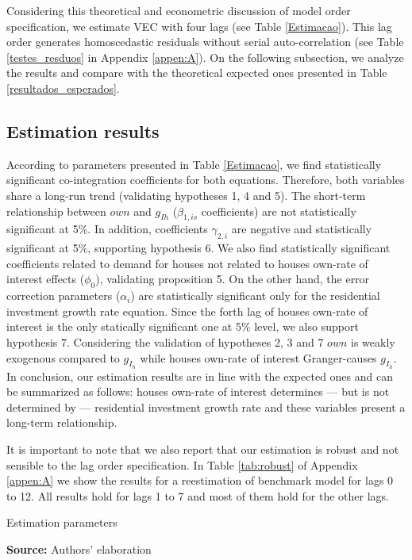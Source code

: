 \documentclass[12pt, a4paper]{article}
\begin{document}
Considering this theoretical and econometric discussion of model order specification, we estimate VEC with four lags  (see Table \ref{Estimacao}).
This lag order generates homoscedastic residuals without serial auto-correlation (see Table \ref{testes_resduos} in Appendix \ref{appen:A}).
On the following subsection, we analyze the results and compare with the theoretical expected ones presented in Table \ref{resultados_esperados}.


\subsection{Estimation results}
\label{sec:orgaa8f3ca}
\label{sec:results}

According to parameters presented in Table \ref{Estimacao}, we find statistically significant co-integration  coefficients for both equations. 
Therefore, both variables share a long-run trend (validating hypotheses 1, 4 and 5).
The short-term relationship between \(own\) and \(g_{Ih}\) (\(\beta_{1, is}\) coefficients) are not statistically significant at 5\%.
In addition, coefficients \(\gamma_{2,i}\) are negative and statistically significant at 5\%, supporting hypothesis 6.
We also find statistically significant coefficients related to demand for houses not related to houses own-rate of interest effects (\(\phi_0\)), validating proposition 5.
On the other hand, the error correction parameters (\(\alpha_{i}\)) are statistically significant only for the residential investment growth rate equation.
Since the forth lag of houses own-rate of interest is the only statically significant one at 5\% level, we also support hypothesis 7.
Considering the validation of hypotheses 2, 3 and 7 \(own\) is weakly exogenous compared to \(g_{I_h}\) while houses own-rate of interest Granger-causes \(g_{I_h}\).
In conclusion, our estimation results are in line with the expected ones and can be summarized as follows: houses own-rate of interest determines --- but is not determined by --- residential investment growth rate and these variables present a long-term relationship.

It is important to note that we also report that our estimation is robust and not sensible to the lag order specification.
In Table \ref{tab:robust} of Appendix \ref{appen:A} we show the results for a reestimation of benchmark model for lags 0 to 12.
All results hold for lags 1 to 7 and most of them hold for the other lags.


\begin{table}[H]
	\caption{Estimation parameters}
	\centering
	
	\caption*{\textbf{Source:} Authors' elaboration}
\end{table}
\end{document}
